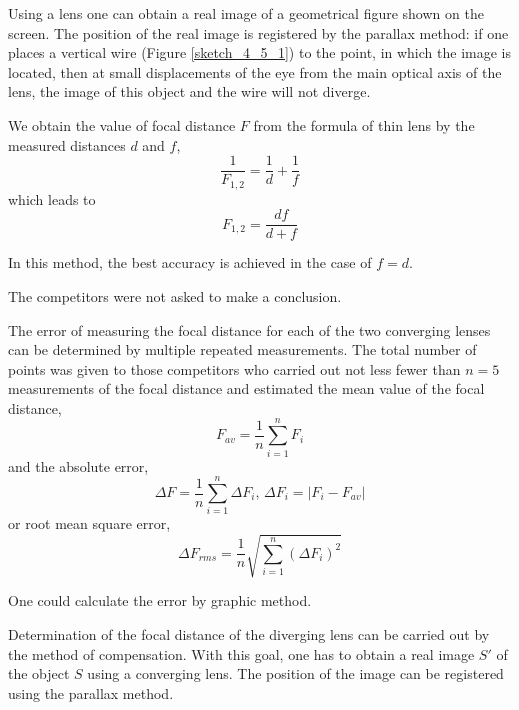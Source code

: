 \documentclass[12pt,a4paper]{book}
\begin{document}
	Using a lens one can obtain a real image of a geometrical figure shown on the screen. The position of the real image is registered by the parallax method: if one places a vertical wire (Figure \ref{sketch_4_5_1}) to the point, in which the image is located, then at small displacements of the eye from the main optical axis of the lens, the image of this object and the wire will not diverge.\par
	We obtain the value of focal distance $F$ from the formula of thin lens by the measured distances $d$ and $f$,
	\begin{equation*}
		\frac{1}{F_{1,2}}=\frac{1}{d}+\frac{1}{f}
	\end{equation*}
	which leads to
	\begin{equation*}
		F_{1,2}=\frac{df}{d+f}
	\end{equation*}\par
	In this method, the best accuracy is achieved in the case of $f=d$.\par
	The competitors were not asked to make a conclusion.\par
	The error of measuring the focal distance for each of the two converging lenses can be determined by multiple repeated measurements. The total number of points was given to those competitors who carried out not less fewer than $n=5$ measurements of the focal distance and estimated the mean value of the focal distance,
	\begin{equation*}
		F_{av}=\frac{1}{n}\sum_{i=1}^{n}F_i
	\end{equation*}
	and the absolute error,
	\begin{equation*}
		\Delta F=\frac{1}{n}\sum_{i=1}^{n}\Delta F_i\text{, }\Delta F_i=|F_i-F_{av}|
	\end{equation*}
	or root mean square error,
	\begin{equation*}
		\Delta F_{rms}=\frac{1}{n}\sqrt{\sum_{i=1}^{n}(\Delta F_i)^2}
	\end{equation*}\par
	One could calculate the error by graphic method.\par
	Determination of the focal distance of the diverging lens can be carried out by the method of compensation. With this goal, one has to obtain a real image $S'$ of the object $S$ using a converging lens. The position of the image can be registered using the parallax method.
\end{document}
